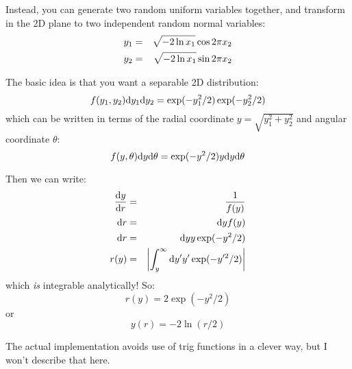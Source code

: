 Instead, you can generate two random uniform variables together, and
transform in the 2D plane to two independent random normal
variables:
\begin{eqnarray}
y_1 &=& \sqrt{-2 \ln x_1} \cos 2\pi x_2 \cr
y_2 &=& \sqrt{-2 \ln x_1} \sin 2\pi x_2
\end{eqnarray}

The basic idea is that you want a separable 2D distribution:
\begin{equation}
f(y_1, y_2) {\rm d}y_1 {\rm d}y_2 = \exp( - y_1^2/2) \exp(- y_2^2/2)
\end{equation}
which can be written in terms of the radial coordinate $y =
\sqrt{y_1^2 + y_2^2}$ and angular coordinate $\theta$:
\begin{equation}
f(y, \theta) {\rm d}y {\rm d}\theta = 
\exp(-y^2/2) y {\rm d}y {\rm d}\theta
\end{equation}

Then we can write:
\begin{eqnarray}
\frac{{\rm d}y}{{\rm d}r} &=& \frac{1}{f(y)} \cr
{{\rm d}r} &=& {\rm d}y {f(y)} \cr
{{\rm d}r} &=& {\rm d}y y \exp(-y^2/2) \cr
r(y) &=& \left|\int_y^{\infty} {\rm d}y' y' \exp(-y'^2/2)\right|
\end{eqnarray}
which {\it is} integrable analytically! So:
\begin{equation}
r(y) = 2 \exp(- y^2 /2)
\end{equation}
or 
\begin{equation}
y(r) = -2 \ln(r /2)
\end{equation}



The actual implementation avoids use of trig functions in a clever
way, but I won't describe that here.
